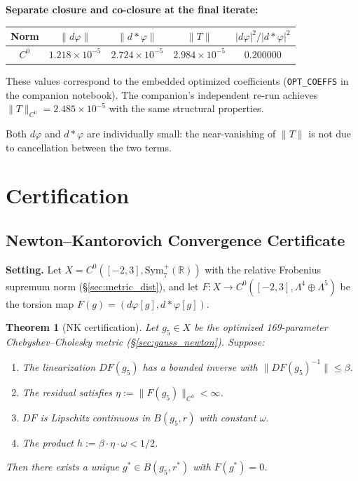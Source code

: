 \documentclass[11pt,a4paper]{article}
\newcommand{\Sym}{\mathrm{Sym}}
\newcommand{\norm}[1]{\|#1\|}
\newtheorem{theorem}{Theorem}[section]
\theoremstyle{remark}
\begin{document}
\textbf{Separate closure and co-closure at the final iterate:}

\begin{table}[H]
\centering
\begin{tabular}{ccccc}
\toprule
\textbf{Norm} & $\norm{d\varphi}$ & $\norm{d{*}\varphi}$ & $\norm{T}$ & $|d\varphi|^2/|d{*}\varphi|^2$ \\
\midrule
$C^0$ & $1.218 \times 10^{-5}$ & $2.724 \times 10^{-5}$ & $2.984 \times 10^{-5}$ & $0.200000$ \\
\bottomrule
\end{tabular}
\end{table}

These values correspond to the embedded optimized coefficients (\texttt{OPT\_COEFFS} in the
companion notebook). The companion's independent re-run achieves
$\norm{T}_{C^0} = 2.485 \times 10^{-5}$ with the same structural properties.

Both $d\varphi$ and $d{*}\varphi$ are individually small: the near-vanishing of $\norm{T}$ is not due to
cancellation between the two terms.

\section{Certification}\label{sec:certification}

\subsection{Newton--Kantorovich Convergence Certificate}\label{sec:nk_cert}

\textbf{Setting.} Let $X = C^0([-2, 3], \Sym^+_7(\mathbb{R}))$ with the relative Frobenius supremum
norm (\S\ref{sec:metric_dist}), and let $F : X \to C^0([-2, 3], \Lambda^4 \oplus \Lambda^5)$ be the torsion map
$F(g) = (d\varphi[g], d{*}\varphi[g])$.

\begin{theorem}[NK certification]\label{thm:nk}
Let $g_5 \in X$ be the optimized 169-parameter
Chebyshev--Cholesky metric (\S\ref{sec:gauss_newton}). Suppose:
\begin{enumerate}
    \item The linearization $DF(g_5)$ has a bounded inverse with $\norm{DF(g_5)^{-1}} \leq \beta$.
    \item The residual satisfies $\eta := \norm{F(g_5)}_{C^0} < \infty$.
    \item $DF$ is Lipschitz continuous in $B(g_5, r)$ with constant $\omega$.
    \item The product $h := \beta \cdot \eta \cdot \omega < 1/2$.
\end{enumerate}
Then there exists a unique $g^* \in B(g_5, r^*)$ with $F(g^*) = 0$.
\end{theorem}
\end{document}
